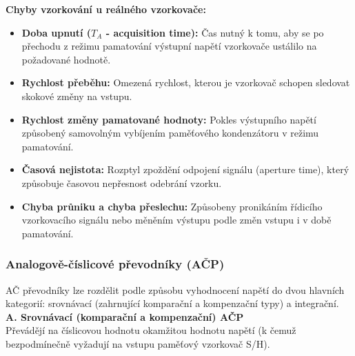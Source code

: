         \textbf{Chyby vzorkování u reálného vzorkovače:}
        \begin{itemize}
            \item \textbf{Doba upnutí ($T_A$ - acquisition time):} Čas nutný k tomu, aby se po přechodu z režimu pamatování výstupní napětí vzorkovače ustálilo na požadované hodnotě.
            \item \textbf{Rychlost přeběhu:} Omezená rychlost, kterou je vzorkovač schopen sledovat skokové změny na vstupu.
            \item \textbf{Rychlost změny pamatované hodnoty:} Pokles výstupního napětí způsobený samovolným vybíjením paměťového kondenzátoru v režimu pamatování.
            \item \textbf{Časová nejistota:} Rozptyl zpoždění odpojení signálu (aperture time), který způsobuje časovou nepřesnost odebrání vzorku.
            \item \textbf{Chyba průniku a chyba přeslechu:} Způsobeny pronikáním řídicího vzorkovacího signálu nebo měněním výstupu podle změn vstupu i v době pamatování.
        \end{itemize}
    \subsubsection{Analogově-číslicové převodníky (AČP)}
        AČ převodníky lze rozdělit podle způsobu vyhodnocení napětí do dvou hlavních kategorií: srovnávací (zahrnující komparační a kompenzační typy) a integrační.
        \\
        \textbf{A. Srovnávací (komparační a kompenzační) AČP}\\
        Převádějí na číslicovou hodnotu okamžitou hodnotu napětí (k čemuž bezpodmínečně vyžadují na vstupu paměťový vzorkovač S/H).
        
